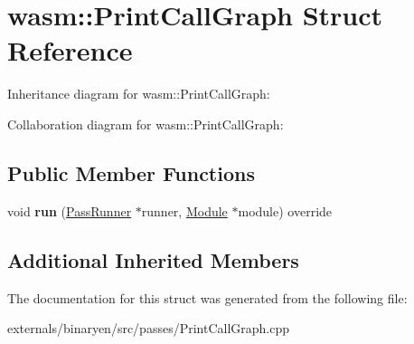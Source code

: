 \hypertarget{structwasm_1_1_print_call_graph}{}\section{wasm\+:\+:Print\+Call\+Graph Struct Reference}
\label{structwasm_1_1_print_call_graph}


Inheritance diagram for wasm\+:\+:Print\+Call\+Graph\+:


Collaboration diagram for wasm\+:\+:Print\+Call\+Graph\+:
\subsection*{Public Member Functions}
\begin{DoxyCompactItemize}
\item 
\mbox{\label{structwasm_1_1_print_call_graph_a1f3ad302fb6e78d6f1ae1a59d9ee958c}} 
void {\bfseries run} (\mbox{\hyperlink{structwasm_1_1_pass_runner}{Pass\+Runner}} $\ast$runner, \mbox{\hyperlink{classwasm_1_1_module}{Module}} $\ast$module) override
\end{DoxyCompactItemize}
\subsection*{Additional Inherited Members}


The documentation for this struct was generated from the following file\+:\begin{DoxyCompactItemize}
\item 
externals/binaryen/src/passes/Print\+Call\+Graph.\+cpp\end{DoxyCompactItemize}
